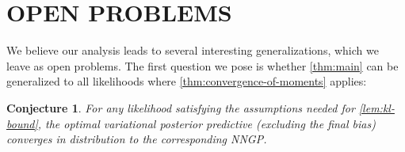 \documentclass[twoside]{article}
\theoremstyle{theoremstyle}
\newtheorem{conjecture}[theorem]{Conjecture}
\begin{document}
%
%	
\section{OPEN PROBLEMS}\label{sec:open-problems}

We believe our analysis leads to several interesting generalizations, which we leave as open problems. The first question we pose is whether \cref{thm:main} can be generalized to all  likelihoods where \cref{thm:convergence-of-moments} applies:

\begin{conjecture}\label{conj:general-conv-in-dist}
For any likelihood satisfying the assumptions needed for \cref{lem:kl-bound}, the optimal variational posterior predictive (excluding the final bias) converges in distribution to the corresponding NNGP. 
\end{conjecture}
\end{document}

